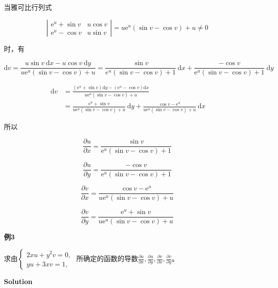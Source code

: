 \documentclass[12pt, a4paper]{article}
\numberwithin{equation}{section}
\newcommand{\rmd}{\mathrm{d}}
\begin{document}
    当雅可比行列式

    $$
        \left|\begin{array}{ll}
            \mathrm{e}^u+\sin v & u \cos v \\
            \mathrm{e}^u-\cos v & u \sin v
        \end{array}\right|=u \mathrm{e}^u(\sin v-\cos v)+u \neq 0
    $$

    时，有

    $$
        \rmd v =\frac{u \sin v \mathrm{~d} x-u \cos v \mathrm{~d} y}{u \mathrm{e}^u(\sin v-\cos v)+u}=
        \frac{\sin v}{e^u(\sin v-\cos v)+1} \mathrm{~d} x+\frac{-\cos v}{\mathrm{e}^u(\sin v-\cos v)+1} \mathrm{~d} y
    $$

    $$
        \begin{aligned}
            \mathrm{~d} v & =\frac{\left(\mathrm{e}^u+\sin v\right) \mathrm{d} y-\left(\mathrm{e}^u-\cos v\right)
                \mathrm{d} x}{u \mathrm{e}^u(\sin v-\cos v)+u} \\
            &=\frac{\mathrm{e}^u+\sin v}{u \mathrm{e}^u(\sin v-\cos v)+u} \mathrm{~d} y+
                \frac{\cos v-\mathrm{e}^u}{u \mathrm{e}^u(\sin v-\cos v)+u} \mathrm{~d} x
        \end{aligned}
    $$

    所以

    $$
        \frac{\partial u}{\partial x}=\frac{\sin v}{\mathrm{e}^u(\sin v-\cos v)+1}
    $$

    $$
        \frac{\partial u}{\partial y}=\frac{-\cos v}{\mathrm{e}^u(\sin v-\cos v)+1}
    $$

    $$
        \frac{\partial v}{\partial x}=\frac{\cos v-\mathrm{e}^u}{u \mathrm{e}^u(\sin v-\cos v)+u}
    $$

    $$
        \frac{\partial v}{\partial y}=\frac{\mathrm{e}^u+\sin v}{u \mathrm{e}^u(\sin v-\cos v)+u}
    $$

    \textbf{例3}
    \vspace{1em}

    求由$\left\{\begin{array}{l}2 x u+y^2 v=0, \\ y u+3 x v=1,\end{array}\right.$
    所确定的函数的导数$\frac{\partial u}{\partial x}, \frac{\partial u}{\partial y},
    \frac{\partial v}{\partial x}, \frac{\partial v}{\partial y}$。
    \vspace{1em}

    \textbf{Solution}
    \vspace{1em}
\end{document}
